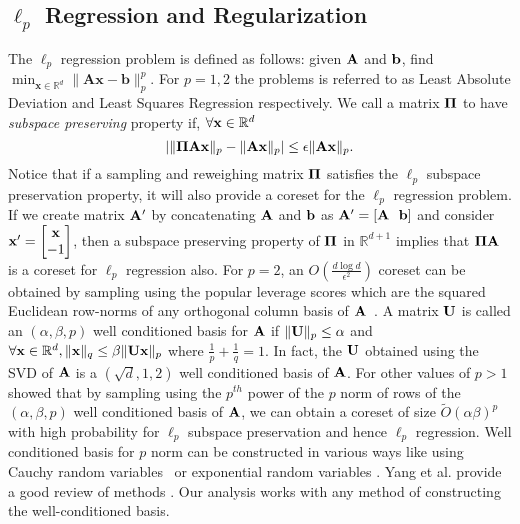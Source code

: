 \subsection{$\ell_p$ Regression and Regularization}
The $\ell_p$ regression problem is defined as follows: given $\mathbf{A}$ and $\mathbf{b}$, find $\min _{\mathbf{x} \in \mathbb{R}^d} \|\mathbf{Ax} - \mathbf{b}\|_p^p$. 
For $p=1,2$ the problems is referred to as Least Absolute Deviation and Least Squares Regression  respectively.
We call a matrix $\mathbf{\Pi}$ to have  {\em subspace preserving} property if, $\forall {\mathbf{x}} \in \mathbb{R}^d$
\begin{equation*}
| \|\mathbf{\Pi Ax}\|_p - \|\mathbf{Ax}\|_p | \leq \epsilon \|\mathbf{Ax}\|_p.
\end{equation*}
Notice that if a sampling and reweighing matrix $\mathbf{\Pi}$ satisfies the $\ell_p$ subspace preservation property, it will also provide a coreset for the $\ell_p$ regression problem.
If we create matrix $\mathbf{A'}$ by concatenating $\mathbf{A}$ and $\mathbf{b}$ as $\mathbf{A'}=\mathbf{[A ~~ b]}$ and consider $\mathbf{x'}=\begin{bmatrix} \mathbf{x}\\ -1 \end{bmatrix}$, then a subspace preserving property of $\mathbf{\Pi}$ in $\mathbb{R}^{d+1}$ implies that  $\mathbf{\Pi A}$ is a coreset for $\ell_p$ regression also.
For $p=2$, an  $O(\frac{d \log{d}}{\epsilon^2})$ coreset can be obtained by sampling  using the popular leverage scores which are the squared Euclidean row-norms of any orthogonal column basis of $\mathbf{A}$~\cite{drineas2006sampling}.
%
A matrix $\mathbf{U}$ is called an $(\alpha,\beta,p)$ well conditioned basis for $\mathbf{A}$ if $\|\mathbf{U}\|_p \leq \alpha$ and $\forall \mathbf{x} \in \mathbb{R}^d, \|\mathbf{x}\|_q  \leq \beta \|\mathbf{U}\mathbf{x}\|_p $ where $\frac{1}{p}+\frac{1}{q}=1$. 
In fact, the $\mathbf{U}$ obtained using the SVD of $\mathbf{A}$ is a $(\sqrt{d},1,2)$ well conditioned basis of $\mathbf{A}$. 
For other values of $p>1$ \cite{dasgupta2009sampling} showed that by sampling using the $p^{th}$ power of the $p$ norm of rows of the $(\alpha,\beta,p)$ well conditioned basis of $\mathbf{A}$, we can obtain a coreset of size $\tilde{O}(\alpha\beta)^p$ with high probability for $\ell_p$ subspace preservation and hence $\ell_p$ regression. Well conditioned basis for $p$ norm can be constructed in various ways like using Cauchy random variables~\cite{sohler2011subspace} or exponential random variables \cite{woodruff2013subspace}. Yang et al. provide a good review of methods \cite{yang2015implementing}. Our analysis works with any method of constructing the well-conditioned basis.
